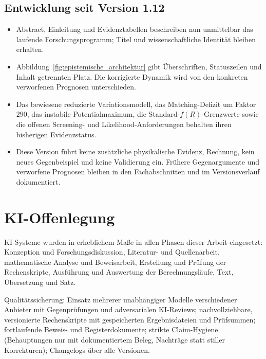 \documentclass[12pt,a4paper]{article}
\theoremstyle{definition}
\theoremstyle{plain}
\theoremstyle{remark}
\begin{document}
\clearpage

\subsection*{Entwicklung seit Version 1.12}
\begin{itemize}
\item Abstract, Einleitung und Evidenztabellen beschreiben nun unmittelbar
das laufende Forschungsprogramm; Titel und wissenschaftliche Identität bleiben erhalten.
\item Abbildung~\ref{fig:epistemische_architektur} gibt Überschriften, Statuszeilen
und Inhalt getrennten Platz. Die korrigierte Dynamik wird von den konkreten
verworfenen Prognosen unterschieden.
\item Das bewiesene reduzierte Variationsmodell, das Matching-Defizit um Faktor
\(290\), das instabile Potentialmaximum, die Standard-\(f(R)\)-Grenzwerte sowie
die offenen Screening- und Likelihood-Anforderungen behalten ihren bisherigen Evidenzstatus.
\item Diese Version führt keine zusätzliche physikalische Evidenz, Rechnung,
kein neues Gegenbeispiel und keine Validierung ein. Frühere Gegenargumente und
verworfene Prognosen bleiben in den Fachabschnitten und im Versionsverlauf dokumentiert.
\end{itemize}

\section*{KI-Offenlegung}

\noindent
KI-Systeme wurden in erheblichem Ma\ss{}e in allen Phasen dieser Arbeit
eingesetzt: Konzeption und Forschungsdiskussion, Literatur- und
Quellenarbeit, mathematische Analyse und Beweisarbeit, Erstellung und
Pr\"ufung der Rechenskripte, Ausf\"uhrung und Auswertung der
Berechnungsl\"aufe, Text, \"Ubersetzung und Satz.

\medskip

\noindent
Qualit\"atssicherung: Einsatz mehrerer unabh\"angiger Modelle
verschiedener Anbieter mit Gegenpr\"ufungen und adversarialen KI-Reviews;
nachvollziehbare, versionierte Rechenskripte mit gespeicherten
Ergebnisdateien und Pr\"ufsummen; fortlaufende Beweis- und
Registerdokumente; strikte Claim-Hygiene (Behauptungen nur mit
dokumentiertem Beleg, Nachtr\"age statt stiller Korrekturen); Changelogs
\"uber alle Versionen.
\end{document}
